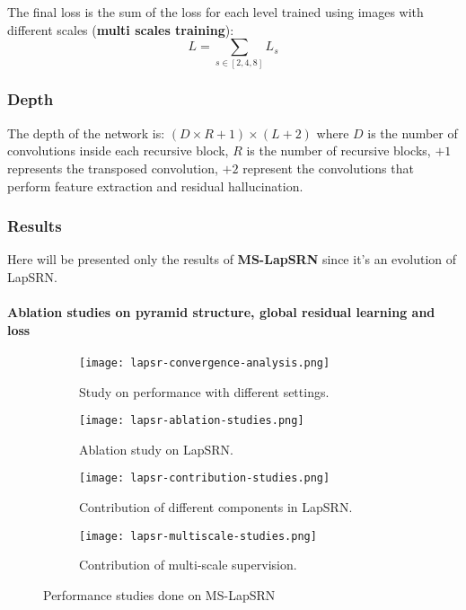The final loss is the sum of the loss for each level trained using images with different scales (\textbf{multi scales training}):
$$
L= \sum_{s \in [2,4,8]} L_s
$$
\subsubsection{Depth}
The depth of the network is: $ (D \times R + 1) \times (L + 2)$ where $D$ is the number of convolutions inside each recursive block, $R$ is the number of recursive blocks, $+1$ represents the transposed convolution, $+2$ represent the convolutions that perform feature extraction and residual hallucination.
\subsubsection{Results}

Here will be presented only the results of \textbf{MS-LapSRN}\cite{MSLapSRN} since it's an evolution of LapSRN.

\paragraph{Ablation studies on pyramid structure, global residual learning and loss}
\begin{figure}
    \begin{subfigure}{0.49\textwidth}
        \centering
        \texttt{[image: lapsr-convergence-analysis.png]}
        \caption{Study on performance with different settings.}
    \end{subfigure}
    \begin{subfigure}{0.49\textwidth}
        \centering
        \texttt{[image: lapsr-ablation-studies.png]}
        \caption{Ablation study on LapSRN.}
    \end{subfigure}
    \begin{subfigure}{0.49\textwidth}
        \centering
        \texttt{[image: lapsr-contribution-studies.png]}
        \caption{Contribution of different components in LapSRN.}
    \end{subfigure}
    \begin{subfigure}{0.49\textwidth}
        \centering
        \texttt{[image: lapsr-multiscale-studies.png]}
        \caption{Contribution of multi-scale supervision.}
    \end{subfigure}
    \caption{Performance studies done on MS-LapSRN}\label{lapsr:performance-studies}
\end{figure}

